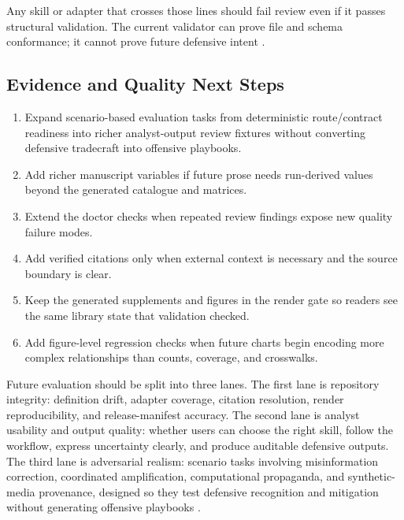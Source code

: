 \documentclass[
]{article}
\providecommand{\tightlist}{%
  \setlength{\itemsep}{0pt}\setlength{\parskip}{0pt}}
\begin{document}
Any skill or adapter that crosses those lines should fail review even if
it passes structural validation. The current validator can prove file
and schema conformance; it cannot prove future defensive intent
\citep{ageint2026}.

\subsection{Evidence and Quality Next
Steps}\label{evidence-and-quality-next-steps}

\begin{enumerate}
\def\labelenumi{\arabic{enumi}.}
\tightlist
\item
  Expand scenario-based evaluation tasks from deterministic
  route/contract readiness into richer analyst-output review fixtures
  without converting defensive tradecraft into offensive playbooks.
\item
  Add richer manuscript variables if future prose needs run-derived
  values beyond the generated catalogue and matrices.
\item
  Extend the doctor checks when repeated review findings expose new
  quality failure modes.
\item
  Add verified citations only when external context is necessary and the
  source boundary is clear.
\item
  Keep the generated supplements and figures in the render gate so
  readers see the same library state that validation checked.
\item
  Add figure-level regression checks when future charts begin encoding
  more complex relationships than counts, coverage, and crosswalks.
\end{enumerate}

Future evaluation should be split into three lanes. The first lane is
repository integrity: definition drift, adapter coverage, citation
resolution, render reproducibility, and release-manifest accuracy. The
second lane is analyst usability and output quality: whether users can
choose the right skill, follow the workflow, express uncertainty
clearly, and produce auditable defensive outputs. The third lane is
adversarial realism: scenario tasks involving misinformation correction,
coordinated amplification, computational propaganda, and synthetic-media
provenance, designed so they test defensive recognition and mitigation
without generating offensive playbooks
\citep{lewandowsky2012misinformationCorrection, ferrara2016socialBots, bradshawHoward2019globalDisinformation, mirskyLee2021deepfakes, c2pa2026spec}.
\end{document}
